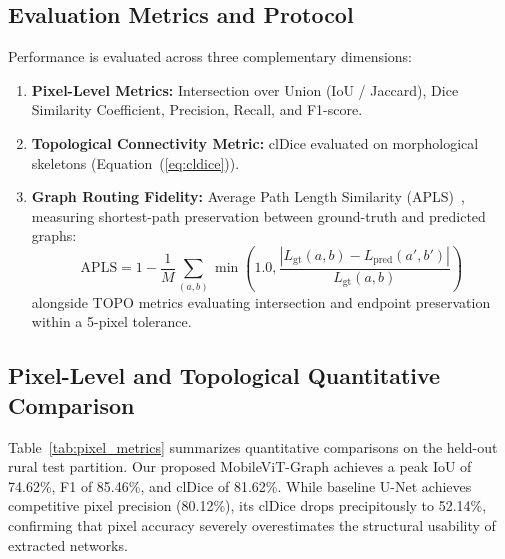 \documentclass[conference]{IEEEtran}
\begin{document}
\subsection{Evaluation Metrics and Protocol}
Performance is evaluated across three complementary dimensions:
\begin{enumerate}
    \item \textbf{Pixel-Level Metrics:} Intersection over Union (IoU / Jaccard), Dice Similarity Coefficient, Precision, Recall, and F1-score.
    \item \textbf{Topological Connectivity Metric:} clDice evaluated on morphological skeletons (Equation~(\ref{eq:cldice})).
    \item \textbf{Graph Routing Fidelity:} Average Path Length Similarity (APLS)~\cite{vanetten2018spacenet}, measuring shortest-path preservation between ground-truth and predicted graphs:
    \begin{equation}
        \text{APLS} = 1 - \frac{1}{M} \sum_{(a, b)} \min\left(1.0, \frac{|L_{\text{gt}}(a, b) - L_{\text{pred}}(a', b')|}{L_{\text{gt}}(a, b)}\right)
    \end{equation}
    alongside TOPO metrics evaluating intersection and endpoint preservation within a 5-pixel tolerance.
\end{enumerate}

\subsection{Pixel-Level and Topological Quantitative Comparison}
Table~\ref{tab:pixel_metrics} summarizes quantitative comparisons on the held-out rural test partition. Our proposed MobileViT-Graph achieves a peak IoU of 74.62\%, F1 of 85.46\%, and clDice of 81.62\%. While baseline U-Net achieves competitive pixel precision (80.12\%), its clDice drops precipitously to 52.14\%, confirming that pixel accuracy severely overestimates the structural usability of extracted networks.

\begin{table}[t]
\centering
\caption{Quantitative Performance Benchmarks on Held-Out Rural Test Dataset}
\label{tab:pixel_metrics}
\end{table}
\end{document}
